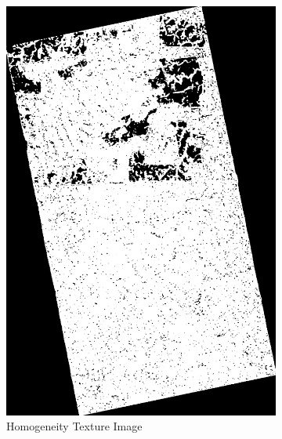 \begin{figure}[H]
\begin{subfigure}[b]{0.4\linewidth}
    \includegraphics[width=\linewidth]{Chapter4/sum_and_diff_textures/homogeneityimage.png}
     \caption{ Homogeneity Texture Image}
  \end{subfigure}
  \centering
  \begin{subfigure}[b]{0.4\linewidth}

\end{subfigure}
\end{figure}
